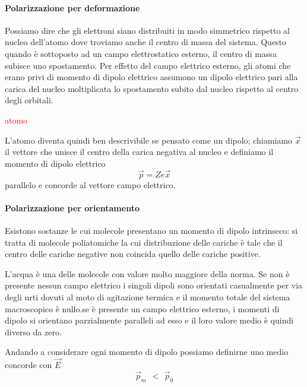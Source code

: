 \documentclass[x11names]{report}
\begin{document}
\paragraph*{Polarizzazione per deformazione}
Possiamo dire che gli elettroni siano distribuiti in modo simmetrico rispetto al nucleo dell'atomo dove troviamo anche il centro di massa del sistema. Questo quando è sottoposto ad un campo elettrostatico esterno, il centro di massa subisce uno spostamento. Per effetto del campo elettrico esterno, gli atomi che erano privi di momento di dipolo elettrico assumono un dipolo elettrico pari alla carica del nucleo moltiplicata lo spostamento subito dal nucleo rispetto al centro degli orbitali.

\begin{center}
	\textcolor{red}{atomo}
\end{center}

L'atomo diventa quindi ben descrivibile se pensato come un dipolo; chiamiamo \(\vec{x}\) il vettore che unisce il centro della carica negativa al nucleo e definiamo il momento di dipolo elettrico
\[
\vec{p} = Z e \vec{x}
\]
parallelo e concorde al vettore campo elettrico.

\paragraph*{Polarizzazione per orientamento} \label{orient}
Esistono sostanze le cui molecole presentano un momento di dipolo intrinseco: si tratta di molecole poliatomiche la cui distribuzione delle cariche è tale che il centro delle cariche negative non coincida quello delle cariche positive. 

L'acqua è una delle molecole con valore molto maggiore della norma. Se non è presente nessun campo elettrico i singoli dipoli sono orientati casualmente per via degli urti dovuti al moto di agitazione termica e il momento totale del sistema macroscopico è nullo.se è presente un campo elettrico esterno, i momenti di dipolo si orientano parzialmente paralleli ad esso e il loro valore medio è quindi diverso da zero.

Andando a considerare ogni momento di dipolo possiamo definirne uno medio concorde con \(\vec{E}\)
\[
\vec{p}_m \,\ < \,\ \vec{p}_0
\]

\begin{figure}[H]
	\centering
\end{figure}
 
\end{document}
